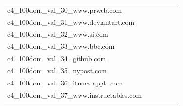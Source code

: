 \documentclass[dvipsnames]{article}
\begin{document}
\begin{appendix}
{\begin{longtable}{m{6cm}m{1.7cm}m{1.7cm}m{1.7cm}m{1.7cm}m{1.7cm}}
	c4\_100dom\_val\_30\_www.prweb.com  & \colorbox[HTML]{fcfed9}{\makebox[\mywidth][c]{11.18}} & \colorbox[HTML]{e9f6af}{\makebox[\mywidth][c]{10.88}} & \colorbox[HTML]{ffffe5}{\makebox[\mywidth][c]{11.92}} & \colorbox[HTML]{ddf1a6}{\makebox[\mywidth][c]{10.83}} & \colorbox[HTML]{77c578}{\makebox[\mywidth][c]{10.65}}\\
	c4\_100dom\_val\_31\_www.deviantart.com  & \colorbox[HTML]{fefee0}{\makebox[\mywidth][c]{21.78}} & \colorbox[HTML]{e7f5ad}{\makebox[\mywidth][c]{21.05}} & \colorbox[HTML]{ffffe5}{\makebox[\mywidth][c]{22.78}} & \colorbox[HTML]{e0f2a8}{\makebox[\mywidth][c]{21.00}} & \colorbox[HTML]{77c578}{\makebox[\mywidth][c]{20.69}}\\
	c4\_100dom\_val\_32\_www.si.com  & \colorbox[HTML]{ffffe5}{\makebox[\mywidth][c]{11.49}} & \colorbox[HTML]{f1f9b4}{\makebox[\mywidth][c]{11.00}} & \colorbox[HTML]{ffffe5}{\makebox[\mywidth][c]{11.92}} & \colorbox[HTML]{d8efa2}{\makebox[\mywidth][c]{10.90}} & \colorbox[HTML]{77c578}{\makebox[\mywidth][c]{10.76}}\\
	c4\_100dom\_val\_33\_www.bbc.com  & \colorbox[HTML]{ffffe5}{\makebox[\mywidth][c]{9.35}} & \colorbox[HTML]{f9fcc6}{\makebox[\mywidth][c]{8.91}} & \colorbox[HTML]{ffffe5}{\makebox[\mywidth][c]{9.41}} & \colorbox[HTML]{def2a6}{\makebox[\mywidth][c]{8.80}} & \colorbox[HTML]{77c578}{\makebox[\mywidth][c]{8.70}}\\
	c4\_100dom\_val\_34\_github.com  & \colorbox[HTML]{e6f5ad}{\makebox[\mywidth][c]{11.57}} & \colorbox[HTML]{d7efa2}{\makebox[\mywidth][c]{11.49}} & \colorbox[HTML]{ffffe5}{\makebox[\mywidth][c]{12.94}} & \colorbox[HTML]{bae294}{\makebox[\mywidth][c]{11.40}} & \colorbox[HTML]{77c578}{\makebox[\mywidth][c]{11.28}}\\
	c4\_100dom\_val\_35\_nypost.com  & \colorbox[HTML]{fefee0}{\makebox[\mywidth][c]{14.31}} & \colorbox[HTML]{a5d98b}{\makebox[\mywidth][c]{13.41}} & \colorbox[HTML]{ffffe5}{\makebox[\mywidth][c]{15.29}} & \colorbox[HTML]{e1f3a9}{\makebox[\mywidth][c]{13.62}} & \colorbox[HTML]{77c578}{\makebox[\mywidth][c]{13.31}}\\
	c4\_100dom\_val\_36\_itunes.apple.com  & \colorbox[HTML]{fefee2}{\makebox[\mywidth][c]{16.49}} & \colorbox[HTML]{d9f0a3}{\makebox[\mywidth][c]{15.88}} & \colorbox[HTML]{ffffe5}{\makebox[\mywidth][c]{17.15}} & \colorbox[HTML]{eff8b3}{\makebox[\mywidth][c]{15.98}} & \colorbox[HTML]{77c578}{\makebox[\mywidth][c]{15.69}}\\
	c4\_100dom\_val\_37\_www.instructables.com  & \colorbox[HTML]{fdfedc}{\makebox[\mywidth][c]{16.75}} & \colorbox[HTML]{f0f9b4}{\makebox[\mywidth][c]{16.33}} & \colorbox[HTML]{ffffe5}{\makebox[\mywidth][c]{17.73}} & \colorbox[HTML]{e8f6ae}{\makebox[\mywidth][c]{16.28}} & \colorbox[HTML]{77c578}{\makebox[\mywidth][c]{15.97}}\\

\end{longtable}}
\end{appendix}
\end{document}

